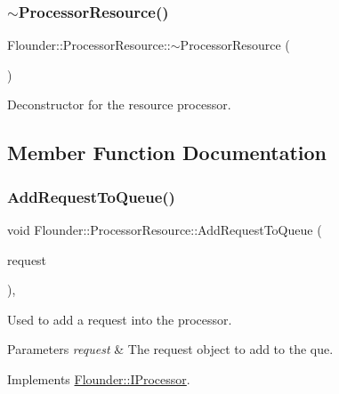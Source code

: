 \subsubsection{\texorpdfstring{$\sim$\+Processor\+Resource()}{~ProcessorResource()}}
{\footnotesize\ttfamily Flounder\+::\+Processor\+Resource\+::$\sim$\+Processor\+Resource (\begin{DoxyParamCaption}{ }\end{DoxyParamCaption})}



Deconstructor for the resource processor. 



\subsection{Member Function Documentation}
\mbox{\label{class_flounder_1_1_processor_resource_afcf217b354213aba94e6288583e88d49}} 
\subsubsection{\texorpdfstring{Add\+Request\+To\+Queue()}{AddRequestToQueue()}}
{\footnotesize\ttfamily void Flounder\+::\+Processor\+Resource\+::\+Add\+Request\+To\+Queue (\begin{DoxyParamCaption}\item[{\hyperlink{class_flounder_1_1_i_request}{I\+Request} $\ast$}]{request }\end{DoxyParamCaption})\hspace{0.3cm}{\ttfamily [override]}, {\ttfamily [virtual]}}



Used to add a request into the processor. 


\begin{DoxyParams}{Parameters}
{\em request} & The request object to add to the que. \\
\hline
\end{DoxyParams}


Implements \hyperlink{class_flounder_1_1_i_processor_a147a68665ac362d33f5de7740279d224}{Flounder\+::\+I\+Processor}.

\mbox{\label{class_flounder_1_1_processor_resource_a5c3075bee60c9a44464d7effbf05da4a}} 
